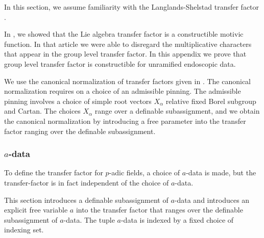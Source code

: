 In this section, we assume familiarity with the Langlands-Shelstad
transfer factor \cite{langlands1987definition}.

In \cite{gordon}, we showed that the Lie algebra transfer factor is a
constructible motivic function.  In that article we were able to
disregard the multiplicative characters that appear in the group level
transfer factor.  In this appendix we prove that group level transfer
factor is constructible for unramified endoscopic data.

We use the canonical normalization of transfer factors given in
\cite[\S7]{hales1993simple}.  The canonical normalization requires on
a choice of an admissible pinning.  The admissible pinning involves a
choice of simple root vectors $X_\alpha$ relative fixed Borel subgroup
and Cartan.  The choices $X_\alpha$ range over a definable
subassignment, and we obtain the canonical normalization by
introducing a free parameter into the transfer factor ranging over the
definable subassignment.

\subsubsection{$a$-data}

To define the transfer factor for $p$-adic fields, a choice of
$a$-data is made, but the transfer-factor is in fact independent of
the choice of $a$-data.

This section introduces a definable subassignment of $a$-data and
introduces an explicit free variable $a$ into the transfer factor that
ranges over the definable subassignment of $a$-data.  The tuple
$a$-data is indexed by a fixed choice of indexing set.

